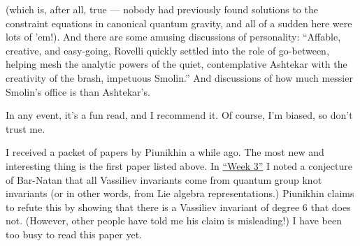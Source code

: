 \documentclass{article}
\def\tightlist{}
\renewcommand{\texttt}[1]{%
  \begingroup
  \ttfamily
  \begingroup\lccode`~=`/\lowercase{\endgroup\def~}{/\discretionary{}{}{}}%
  \begingroup\lccode`~=`[\lowercase{\endgroup\def~}{[\discretionary{}{}{}}%
  \begingroup\lccode`~=`.\lowercase{\endgroup\def~}{.\discretionary{}{}{}}%
  \catcode`/=\active\catcode`[=\active\catcode`.=\active
  \scantokens{#1\noexpand}%
  \endgroup
}
\begin{document}
(which is, after all, true --- nobody had previously found solutions to
the constraint equations in canonical quantum gravity, and all of a
sudden here were lots of 'em!). And there are some amusing discussions
of personality: ``Affable, creative, and easy-going, Rovelli quickly
settled into the role of go-between, helping mesh the analytic powers of
the quiet, contemplative Ashtekar with the creativity of the brash,
impetuous Smolin.'' And discussions of how much messier Smolin's office
is than Ashtekar's.

In any event, it's a fun read, and I recommend it. Of course, I'm
biased, so don't trust me.


I received a packet of papers by Piunikhin a while ago. The most new and
interesting thing is the first paper listed above. In
\protect\hyperlink{week3}{``Week 3''} I noted a conjecture of Bar-Natan
that all Vassiliev invariants come from quantum group knot invariants
(or in other words, from Lie algebra representations.) Piunikhin claims
to refute this by showing that there is a Vassiliev invariant of degree
6 that does not. (However, other people have told me his claim is
misleading!) I have been too busy to read this paper yet.

\end{document}
